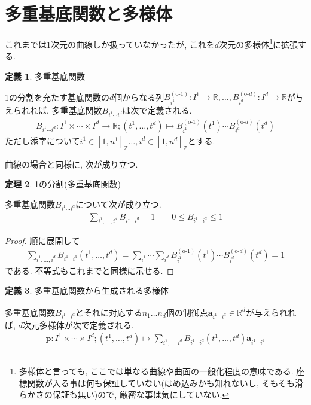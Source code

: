 \documentclass{jsarticle}
\newcommand\setR{\mathbb{R}}
\newcommand\squa[1]{[#1]}
\newcommand\Z[2]{\squa{#1,#2}_\mathbb{Z}}
\theoremstyle{definition}%
\newtheorem{thm}{定理}
\newtheorem{defn}[thm]{定義}
\begin{document}
\section{多重基底関数と多様体}
これまでは$1$次元の曲線しか扱っていなかったが, これを$d$次元の多様体\footnote{
多様体と言っても, ここでは単なる曲線や曲面の一般化程度の意味である. 座標関数が入る事は何も保証していない(はめ込みかも知れないし, そもそも滑らかさの保証も無い)ので, 厳密な事は気にしていない.
}に拡張する.
\begin{screen}
	\begin{defn}
        多重基底関数

        1の分割を充たす基底関数の$d$個からなる列$B_{i^1}^{(\text{o-}1)}:I^1\to \setR,\dots,B_{i^d}^{(\text{o-}d)}:I^d\to \setR$が与えられれば, 多重基底関数$B_{i^1\cdots i^d}$は次で定義される.
		\begin{align}
            B_{i^1\cdots i^d}:I^1\times \cdots\times I^d\to \setR;(t^1,\dots,t^d)\mapsto B_{i^1}^{(\text{o-}1)}(t^1)\cdots B_{i^d}^{(\text{o-}d)}(t^d)
		\end{align}
        ただし添字について$i^1\in\Z{1}{n^1}\dots,i^d\in\Z{1}{n^d}$とする.
	\end{defn}
\end{screen}
曲線の場合と同様に, 次が成り立つ.
\begin{screen}
	\begin{thm}
		1の分割(多重基底関数)

        多重基底関数$B_{i^1\cdots i^d}$について次が成り立つ.
		\begin{align}
			\sum_{i^1,\dots,i^d} B_{i^1\cdots i^d}= 1 \qquad
            0\le B_{i^1\cdots i^d}\le 1
		\end{align}
	\end{thm}
\end{screen}
\begin{proof}
	順に展開して
	\begin{align}
        \sum_{i^1,\dots,i^d} B_{i^1\cdots i^d}(t^1,\dots,t^d)
        =\sum_{i^1}\cdots\sum_{i^d} B_{i^1}^{(\text{o-}1)}(t^1)\cdots B_{i^d}^{(\text{o-}d)}(t^d)
        = 1
	\end{align}
	である.
    不等式もこれまでと同様に示せる.
\end{proof}
\begin{screen}
	\begin{defn}
        多重基底関数から生成される多様体

        多重基底関数$B_{i^1\cdots i^d}$とそれに対応する$n_1\dots n_d$個の制御点$\bm{a}_{i^1\cdots i^d}\in \setR^{\tilde{d}}$が与えられれば, $d$次元多様体が次で定義される.
		\begin{align}
            \bm{p}:I^1\times\cdots\times I^d;(t^1,\dots,t^d)\mapsto\sum_{i^1,\dots,i^d} B_{i^1\cdots i^d}(t^1,\dots,t^d)\bm{a}_{i^1\cdots i^d}
		\end{align}
	\end{defn}
\end{screen}
\end{document}
